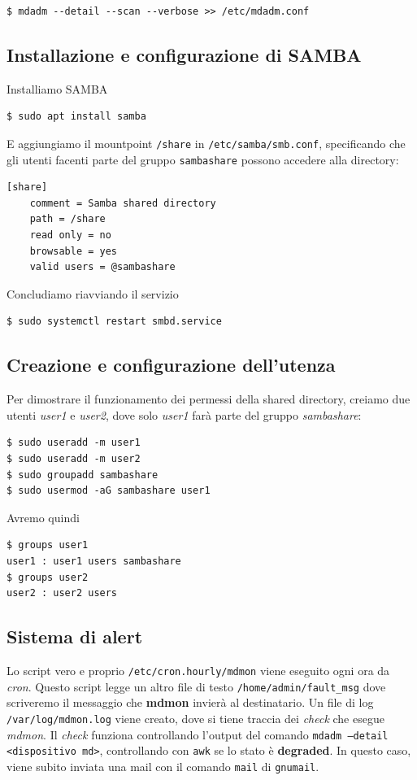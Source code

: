 \documentclass[11pt]{article}
\begin{document}
\begin{verbatim}
$ mdadm --detail --scan --verbose >> /etc/mdadm.conf
\end{verbatim}

\subsection{Installazione e configurazione di SAMBA}
Installiamo SAMBA
\begin{verbatim}
$ sudo apt install samba
\end{verbatim}
E aggiungiamo il mountpoint \texttt{/share} in \texttt{/etc/samba/smb.conf}, specificando che gli utenti facenti parte del gruppo \texttt{sambashare} possono accedere alla directory:
\begin{lstlisting}
[share]
    comment = Samba shared directory
    path = /share
    read only = no
    browsable = yes
    valid users = @sambashare
\end{lstlisting}
Concludiamo riavviando il servizio
\begin{verbatim}
$ sudo systemctl restart smbd.service
\end{verbatim}

\subsection{Creazione e configurazione dell'utenza}
Per dimostrare il funzionamento dei permessi della shared directory, creiamo due utenti \textit{user1} e \textit{user2}, dove solo \textit{user1} farà parte del gruppo \textit{sambashare}:
\begin{verbatim}
$ sudo useradd -m user1
$ sudo useradd -m user2
$ sudo groupadd sambashare
$ sudo usermod -aG sambashare user1
\end{verbatim}
Avremo quindi
\begin{verbatim}
$ groups user1
user1 : user1 users sambashare
$ groups user2
user2 : user2 users
\end{verbatim}

\pagebreak

\subsection{Sistema di alert}
Lo script vero e proprio \texttt{/etc/cron.hourly/mdmon} viene eseguito ogni ora da \textit{cron}. Questo script legge un altro file di testo \texttt{/home/admin/fault\_msg} dove scriveremo il messaggio che \textbf{mdmon} invierà al destinatario. Un file di log \texttt{/var/log/mdmon.log} viene creato, dove si tiene traccia dei \textit{check} che esegue \textit{mdmon}. Il \textit{check} funziona controllando l'output del comando \texttt{mdadm --detail <dispositivo md>}, controllando con \texttt{awk} se lo stato è \textbf{degraded}. In questo caso, viene subito inviata una mail con il comando \texttt{mail} di \texttt{gnumail}.
\end{document}
